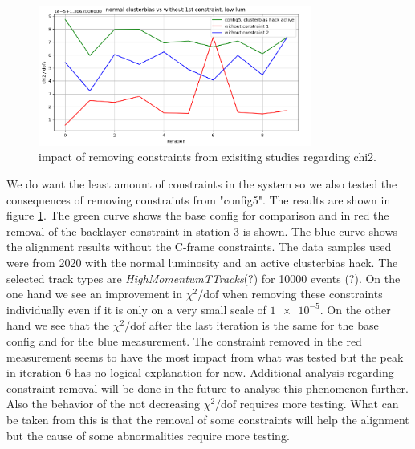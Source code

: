 \begin{figure}
  \centering
  \includegraphics[width=0.8\textwidth]{plots/feb_6_2022/low_lumi_removed_constraints_vs_normal.png}
  \caption{impact of removing constraints from exisiting studies regarding chi2.}
  \label{fig:removeConst}
\end{figure}

We do want the least amount of constraints in the system so we also tested
the consequences of removing constraints from "config5".
The results are shown in figure \ref{fig:removeConst}.
The green curve shows the base config for comparison and in red the removal of the backlayer constraint in station 3 is shown. The blue curve shows the alignment results without the C-frame constraints.
The data samples used were from 2020 with the normal luminosity and an active clusterbias hack.
The selected track types are \textit{HighMomentumTTracks}(?) for 10000 events (?).
On the one hand we see an improvement in $\chi^2 / \text{dof}$ when removing these constraints individually even if it is only on a very small scale of $\num{1e-5}$. On the
other hand we see that the $\chi^2 / \text{dof}$ after the last iteration is the same for the base config and for the blue measurement. The constraint removed in the red measurement seems to have the most impact from what was tested but the peak in iteration 6 has no logical
explanation for now. Additional analysis regarding constraint removal will be done in the future to analyse this phenomenon further.
Also the behavior of the not decreasing $\chi^2 / \text{dof}$ requires more testing.
What can be taken from this is that the removal of some constraints will help
the alignment but the cause of some abnormalities require more testing.
